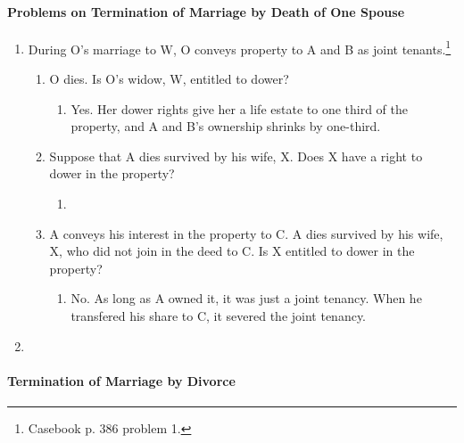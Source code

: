 \paragraph{Problems on Termination of Marriage by Death of One Spouse}

\begin{enumerate}
    \item During O's marriage to W, O conveys property to A and B as joint 
    tenants.\footnote{Casebook p. 386 problem 1.}
    \begin{enumerate}
        \item O dies. Is O's widow, W, entitled to dower?
        \begin{enumerate}
            \item Yes. Her dower rights give her a life estate to one third of 
            the property, and A and B's ownership shrinks by one-third.
        \end{enumerate}
        \item Suppose that A dies survived by his wife, X. Does X have a right 
        to dower in the property?
        \begin{enumerate}
            \item %
        \end{enumerate}
        \item A conveys his interest in the property to C. A dies survived by 
        his wife, X, who did not join in the deed to C. Is X entitled to dower 
        in the property?
        \begin{enumerate}
            \item No. As long as A owned it, it was just a joint tenancy. When 
            he transfered his share to C, it severed the joint tenancy.
        \end{enumerate}

    \end{enumerate}
    \item %
\end{enumerate}

\paragraph{Termination of Marriage by Divorce}

